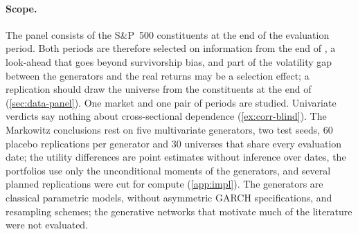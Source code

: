 \paragraph{Scope.}
The panel consists of the S\&P~500 constituents at the end of the evaluation period. Both
periods are therefore selected on information from the end of \TEST{}, a look-ahead that goes
beyond survivorship bias, and part of the volatility gap between the generators and the real
\TEST{} returns may be a selection effect; a replication should draw the universe from the
constituents at the end of \TRAIN{} (\cref{sec:data-panel}). One market and one pair of periods
are studied. Univariate verdicts say nothing
about cross-sectional dependence (\cref{ex:corr-blind}). The Markowitz conclusions rest on five
multivariate generators, two test seeds, 60 placebo replications per generator and 30 universes
that share every evaluation date; the utility differences are point estimates without inference
over dates, the portfolios use only the unconditional moments of the generators, and several
planned replications were cut for compute (\cref{app:impl}). The
generators are classical parametric models, without asymmetric GARCH specifications, and
resampling schemes; the generative networks that motivate much of the literature were not evaluated.


